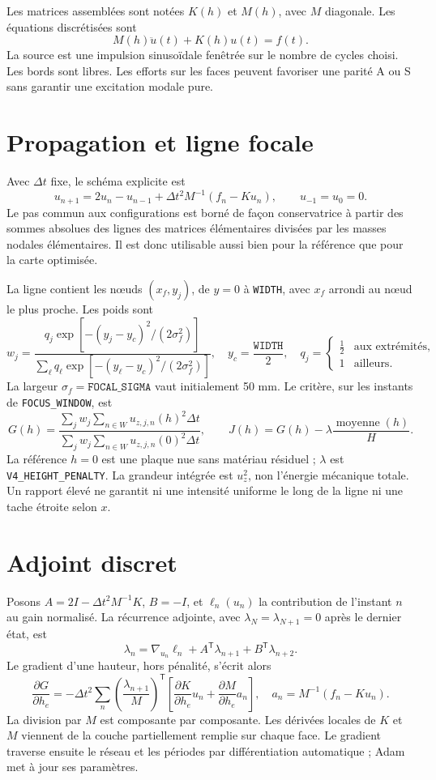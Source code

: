 \documentclass[11pt,a4paper]{article}
\begin{document}
Les matrices assemblées sont notées \(K(h)\) et \(M(h)\), avec \(M\)
diagonale. Les équations discrétisées sont
\[
 M(h)\ddot u(t)+K(h)u(t)=f(t).
\]
La source est une impulsion sinusoïdale fenêtrée sur le nombre de cycles
choisi. Les bords sont libres. Les efforts sur les faces peuvent favoriser
une parité A ou S sans garantir une excitation modale pure.

\section{Propagation et ligne focale}
Avec \(\Delta t\) fixe, le schéma explicite est
\[
u_{n+1}=2u_n-u_{n-1}
 +\Delta t^2M^{-1}(f_n-Ku_n),\qquad u_{-1}=u_0=0.
\]
Le pas commun aux configurations est borné de façon conservatrice à
partir des sommes absolues des lignes des matrices élémentaires divisées
par les masses nodales élémentaires. Il est donc utilisable aussi bien
pour la référence que pour la carte optimisée.

La ligne contient les nœuds \((x_f,y_j)\), de \(y=0\) à \texttt{WIDTH},
avec \(x_f\) arrondi au nœud le plus proche. Les poids sont
\[
w_j=\frac{q_j\exp[-(y_j-y_c)^2/(2\sigma_f^2)]}
{\sum_\ell q_\ell\exp[-(y_\ell-y_c)^2/(2\sigma_f^2)]},
\quad y_c=\frac{\texttt{WIDTH}}2,\quad
q_j=\begin{cases}\frac12&\text{aux extrémités},\\1&\text{ailleurs}.\end{cases}
\]
La largeur \(\sigma_f=\texttt{FOCAL\_SIGMA}\) vaut initialement 50 mm.
Le critère, sur les instants de \texttt{FOCUS\_WINDOW}, est
\[
G(h)=\frac{\displaystyle\sum_jw_j\sum_{n\in W}u_{z,j,n}(h)^2\Delta t}
{\displaystyle\sum_jw_j\sum_{n\in W}u_{z,j,n}(0)^2\Delta t},
\qquad J(h)=G(h)-\lambda\frac{\operatorname{moyenne}(h)}H.
\]
La référence \(h=0\) est une plaque nue sans matériau résiduel ; \(\lambda\)
est \texttt{V4\_HEIGHT\_PENALTY}. La grandeur intégrée est \(u_z^2\), non
l'énergie mécanique totale. Un rapport élevé ne garantit ni une intensité
uniforme le long de la ligne ni une tache étroite selon \(x\).

\section{Adjoint discret}
Posons \(A=2I-\Delta t^2M^{-1}K\),
\(B=-I\), et \(\ell_n(u_n)\) la contribution de l'instant \(n\) au
gain normalisé. La récurrence adjointe, avec
\(\lambda_N=\lambda_{N+1}=0\) après le dernier état, est
\[
\lambda_n=\nabla_{u_n}\ell_n+A^{\mathsf T}\lambda_{n+1}
                 +B^{\mathsf T}\lambda_{n+2}.
\]
Le gradient d'une hauteur, hors pénalité, s'écrit alors
\[
\frac{\partial G}{\partial h_e}
=-\Delta t^2\sum_n
\left(\frac{\lambda_{n+1}}{M}\right)^{\mathsf T}
\left[
\frac{\partial K}{\partial h_e}u_n+
\frac{\partial M}{\partial h_e}a_n
\right],
\quad
a_n=M^{-1}(f_n-Ku_n).
\]
La division par \(M\) est composante par composante. Les dérivées locales
de \(K\) et \(M\) viennent de la couche partiellement remplie sur chaque
face. Le gradient traverse ensuite le réseau et les périodes par
différentiation automatique ; Adam met à jour ses paramètres.
\end{document}
